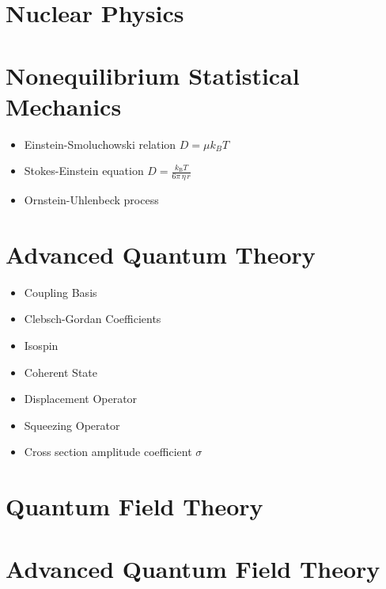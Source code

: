\documentclass[10pt]{article}
\begin{document}
\section{Nuclear Physics}

\section{Nonequilibrium Statistical Mechanics}
\begin{itemize}
	\item Einstein-Smoluchowski relation $D = \mu k_B T$
	\item Stokes-Einstein equation $D=\frac{k_{\mathrm{B}}T}{6\pi \,\eta \,r} $
	\item Ornstein-Uhlenbeck process
\end{itemize}
\section{Advanced Quantum Theory}
\begin{itemize}
	\item Coupling Basis
	\item Clebsch-Gordan Coefficients
	\item Isospin
	\item Coherent State
	\item Displacement Operator
	\item Squeezing Operator
	\item Cross section amplitude coefficient $\sigma$
\end{itemize}

\section{Quantum Field Theory}

\section{Advanced Quantum Field Theory}
\end{document}
